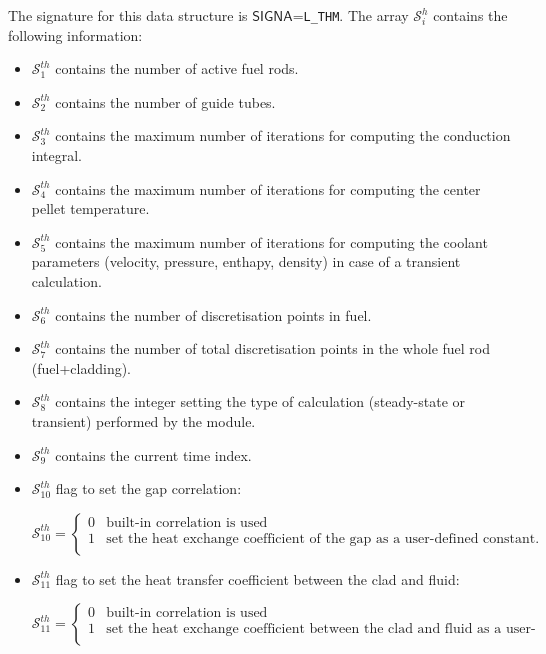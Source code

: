 The signature for this data structure is $\mathsf{SIGNA}$=\verb*|L_THM|. The array $\mathcal{S}^{h}_{i}$
contains the following information: 

\begin{itemize}
\item $\mathcal{S}^{th}_{1}$ contains the number of active fuel rods.
\item $\mathcal{S}^{th}_{2}$ contains the number of guide tubes.
\item $\mathcal{S}^{th}_{3}$ contains the maximum number of iterations for computing the
conduction integral.
\item $\mathcal{S}^{th}_{4}$ contains the maximum number of iterations for computing the
center pellet temperature.
\item $\mathcal{S}^{th}_{5}$ contains the maximum number of iterations for computing the
coolant parameters (velocity, pressure, enthapy, density) in case of a transient calculation.
\item $\mathcal{S}^{th}_{6}$ contains the number of discretisation points in fuel.
\item $\mathcal{S}^{th}_{7}$ contains the number of total discretisation points in the whole fuel rod (fuel+cladding).
\item $\mathcal{S}^{th}_{8}$ contains the integer setting the type of calculation (steady-state or transient) performed by the  module.
\item $\mathcal{S}^{th}_{9}$ contains the current time index.
\item $\mathcal{S}^{th}_{10}$ flag to set the gap correlation:

\begin{displaymath} \mathcal{S}^{th}_{10} = \left\{
\begin{array}{rl}
 0 & \textrm{built-in correlation is used} \\
 1 & \textrm{set the heat exchange coefficient of the gap as a user-defined constant.} \\
\end{array} \right.
\end{displaymath}

\item $\mathcal{S}^{th}_{11}$ flag to set the heat transfer coefficient between the clad and fluid:

\begin{displaymath} \mathcal{S}^{th}_{11} = \left\{
\begin{array}{rl}
 0 & \textrm{built-in correlation is used} \\
 1 & \textrm{set the heat exchange coefficient between the clad and fluid as a user-defined constant.} \\
\end{array} \right.
\end{displaymath}


\end{itemize}
